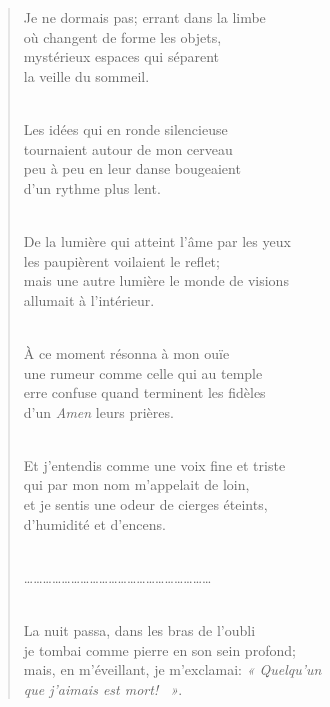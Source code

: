 \documentclass[a4paper,12pt]{book}
\begin{document}
\begin{verse}
Je ne dormais pas; errant dans la limbe \\
où changent de forme les objets, \\
mystérieux espaces qui séparent \\
la veille du sommeil. \\ \

Les idées qui en ronde silencieuse \\
tournaient autour de mon cerveau \\
peu à peu en leur danse bougeaient \\
d'un rythme plus lent. \\ \

De la lumière qui atteint l'âme par les yeux \\
les paupièrent voilaient le reflet; \\
mais une autre lumière le monde de visions \\
allumait à l'intérieur. \\ \

À ce moment résonna à mon ouïe \\
une rumeur comme celle qui au temple \\
erre confuse quand terminent les fidèles \\
d'un {\em Amen\/} leurs prières. \\ \

Et j'entendis comme une voix fine et triste \\
qui par mon nom m'appelait de loin, \\
et je sentis une odeur de cierges éteints, \\
d'humidité et d'encens. \\ \

\ldots\ldots\ldots\ldots\ldots\ldots\ldots\ldots\ldots\ldots\ldots\ldots\ldots\ldots\ldots\ldots\ldots\ldots\ldots\ldots \\ \

La nuit passa, dans les bras de l'oubli \\
je tombai comme pierre en son sein profond; \\
mais, en m'éveillant, je m'exclamai: {\em « Quelqu'un \\
que j'aimais est mort! ~»}. \\
\end{verse}

\bigskip

\tableofcontents
\end{document}
